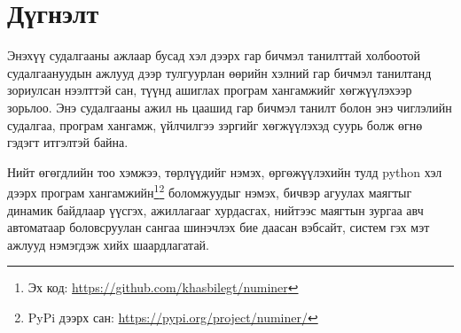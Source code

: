 \chapter{Дүгнэлт}

Энэхүү судалгааны ажлаар бусад хэл дээрх гар бичмэл танилттай холбоотой судалгаануудын ажлууд дээр тулгуурлан өөрийн хэлний гар бичмэл танилтанд зориулсан нээлттэй сан, түүнд ашиглах програм хангамжийг хөгжүүлэхээр зорьлоо. Энэ судалгааны ажил нь цаашид гар бичмэл танилт болон энэ чиглэлийн судалгаа, програм хангамж, үйлчилгээ зэргийг хөгжүүлэхэд суурь болж өгнө гэдэгт итгэлтэй байна.


Нийт өгөгдлийн тоо хэмжээ, төрлүүдийг нэмэх, өргөжүүлэхийн тулд python хэл дээрх програм хангамжийн\footnote{Эх код: \url{https://github.com/khasbilegt/numiner}}\footnote{PyPi дээрх сан: \url{https://pypi.org/project/numiner/}} боломжуудыг нэмэх, бичвэр агуулах маягтыг динамик байдлаар үүсгэх, ажиллагааг хурдасгах, нийтээс маягтын зургаа авч автоматаар боловсруулан сангаа шинэчлэх бие даасан вэбсайт, систем гэх мэт ажлууд нэмэгдэж хийх шаардлагатай.
